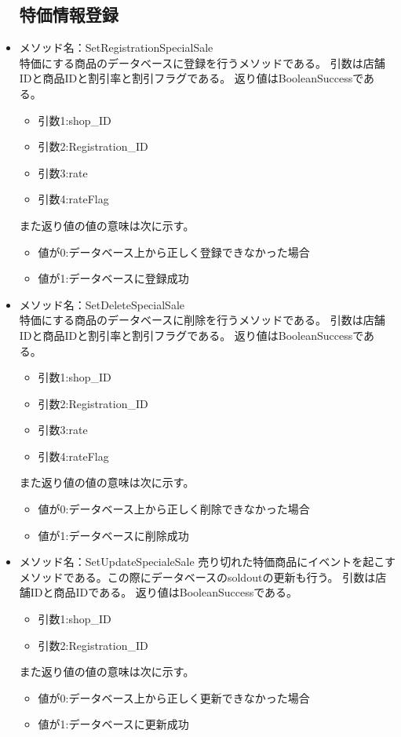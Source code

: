 \documentclass[a4j]{jarticle}
\begin{document}
\begin{itemize}
\subsection{特価情報登録}
%
\item メソッド名：SetRegistrationSpecialSale\\
特価にする商品のデータベースに登録を行うメソッドである。
引数は店舗IDと商品IDと割引率と割引フラグである。
返り値はBooleanSuccessである。
	\begin{itemize}
		\item 引数1:shop\_ID
		\item 引数2:Registration\_ID
		\item 引数3:rate
		\item 引数4:rateFlag
	\end{itemize}
また返り値の値の意味は次に示す。
	\begin{itemize}
		\item 値が0:データベース上から正しく登録できなかった場合
		\item 値が1:データベースに登録成功
	\end{itemize}
%
\item メソッド名：SetDeleteSpecialSale\\
特価にする商品のデータベースに削除を行うメソッドである。
引数は店舗IDと商品IDと割引率と割引フラグである。
返り値はBooleanSuccessである。
	\begin{itemize}
		\item 引数1:shop\_ID
		\item 引数2:Registration\_ID
		\item 引数3:rate
		\item 引数4:rateFlag
	\end{itemize}
また返り値の値の意味は次に示す。
	\begin{itemize}
		\item 値が0:データベース上から正しく削除できなかった場合
		\item 値が1:データベースに削除成功
	\end{itemize}
%
\item メソッド名：SetUpdateSpecialeSale
売り切れた特価商品にイベントを起こすメソッドである。この際にデータベースのsoldoutの更新も行う。
引数は店舗IDと商品IDである。
返り値はBooleanSuccessである。
	\begin{itemize}
		\item 引数1:shop\_ID
		\item 引数2:Registration\_ID

	\end{itemize}
また返り値の値の意味は次に示す。
	\begin{itemize}
		\item 値が0:データベース上から正しく更新できなかった場合
		\item 値が1:データベースに更新成功
	\end{itemize}
\end{itemize}
\end{document}
